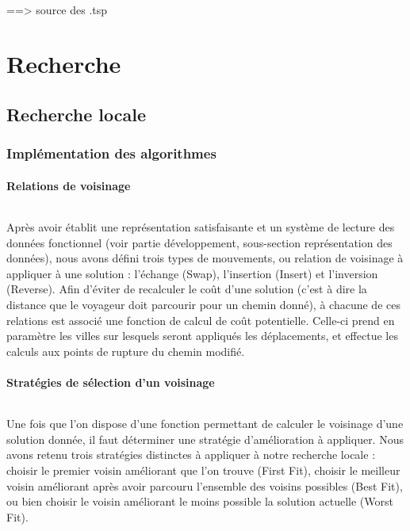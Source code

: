 \documentclass[a4paper,10pt]{report}
\begin{document}
\paragraph{} %
==> source des .tsp

\part{Recherche}
\chapter{Recherche locale}
\section{Implémentation des algorithmes}
\subsection{Relations de voisinage}

\paragraph{}
  Après avoir établit une représentation satisfaisante et un système de lecture des données fonctionnel (voir partie
développement, sous-section représentation des données), nous avons défini trois types de mouvements, ou relation de
voisinage à appliquer à une solution : l'échange (Swap), l'insertion (Insert) et l'inversion (Reverse). Afin d'éviter
de recalculer le coût d'une solution (c'est à dire la distance que le voyageur doit parcourir pour un chemin donné),
à chacune de ces relations est associé une fonction de calcul de coût potentielle. Celle-ci prend en paramètre les
villes sur lesquels seront appliqués les déplacements, et effectue les calculs aux points de rupture du chemin modifié.

\subsection{Stratégies de sélection d'un voisinage}

\paragraph{}
  Une fois que l'on dispose d'une fonction permettant de calculer le voisinage d'une solution donnée, il faut déterminer
une stratégie d'amélioration à appliquer. Nous avons retenu trois stratégies distinctes à appliquer à notre recherche
locale : choisir le premier voisin améliorant que l'on trouve (First Fit), choisir le meilleur voisin améliorant après
avoir parcouru l'ensemble des voisins possibles (Best Fit), ou bien choisir le voisin améliorant le moins possible la
solution actuelle (Worst Fit).
\end{document}
